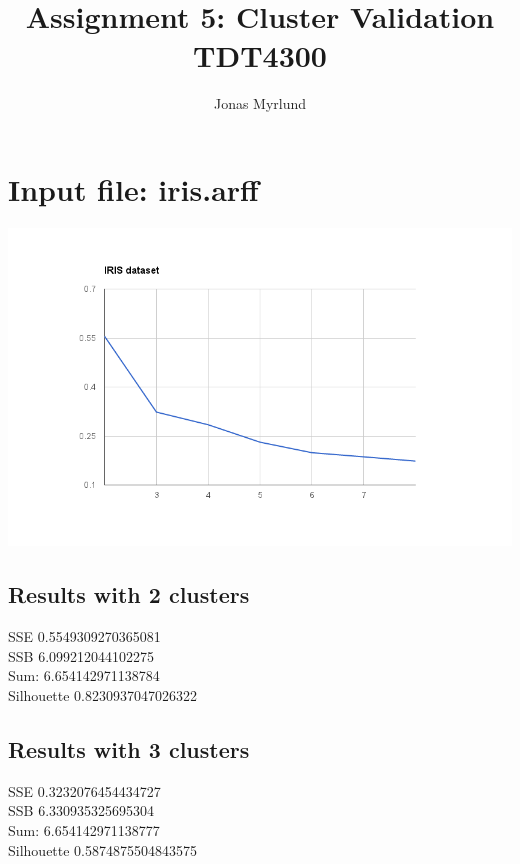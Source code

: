 \documentclass[11pt,a4paper]{article}
\begin{document}
\title{Assignment 5: Cluster Validation \\ \large{TDT4300}}
\author{Jonas Myrlund}

\maketitle

\section{Input file: iris.arff}

\includegraphics[width=\textwidth]{pics/chart_iris}

\subsection{Results with 2 clusters}
SSE 0.5549309270365081 \\
SSB 6.099212044102275 \\
Sum: 6.654142971138784 \\
Silhouette 0.8230937047026322 \\

\subsection{Results with 3 clusters}
SSE 0.3232076454434727 \\
SSB 6.330935325695304 \\
Sum: 6.654142971138777 \\
Silhouette 0.5874875504843575 \\
\end{document}

